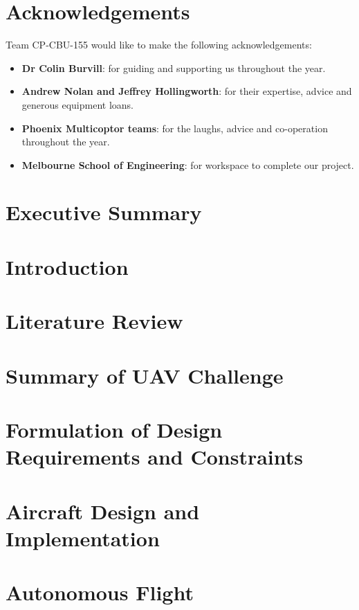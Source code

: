 \documentclass[]{article}
\begin{document}
\section*{Acknowledgements}
Team CP-CBU-155 would like to make the following acknowledgements:
\begin{itemize}
	\item \textbf{Dr Colin Burvill}: for guiding and supporting us throughout the year.
	\item \textbf{Andrew Nolan and Jeffrey Hollingworth}: for their expertise, advice and generous equipment loans.
	\item \textbf{Phoenix Multicoptor teams}: for the laughs, advice and co-operation throughout the year.
	\item \textbf{Melbourne School of Engineering}: for workspace to complete our project.
\end{itemize}



\newpage
\section{Executive Summary}


\section{Introduction}


\section{Literature Review}


\section{Summary of UAV Challenge}


\section{Formulation of Design Requirements and Constraints}


\section{Aircraft Design and Implementation}


\section{Autonomous Flight}

\end{document}
